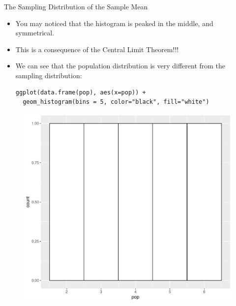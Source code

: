 \documentclass[handout]{beamer}
\begin{document}
\begin{frame}[fragile]{The Sampling Distribution of the Sample Mean}
\scriptsize{
\begin{itemize}
\item You may noticed that the histogram is peaked in the middle, and symmetrical.
\item This is a consequence of the Central Limit Theorem!!!
\item We can see that the population distribution is very different from the sampling distribution:
\begin{verbatim}
ggplot(data.frame(pop), aes(x=pop)) +
  geom_histogram(bins = 5, color="black", fill="white")
\end{verbatim}


\end{itemize}

\begin{figure}[h!]
	\centering
	\includegraphics[scale=0.3]{pics/pop_dist.pdf}
\end{figure}




} 
\end{frame}
\end{document}
